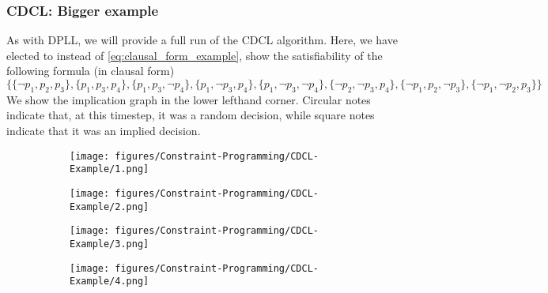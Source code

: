 \subsubsection{CDCL: Bigger example}\label{sec:CDCL_BIG_examp}
As with DPLL, we will provide a full run of the CDCL algorithm. Here, we have elected to instead of \autoref{eq:clausal_form_example}, show the satisfiability of the following formula (in clausal form)
\begin{equation}\label{eq:SAT_example2}
    \Big\{
        \{
            \neg p_1, p_2, p_3
        \},
        \{
            p_1, p_3, p_4
        \},
        \{
            p_1, p_3, \neg p_4
        \},
        \{
            p_1, \neg p_3, p_4
        \},
        \{
            p_1, \neg p_3, \neg p_4
        \},
        \{
            \neg p_2, \neg p_3, p_4
        \},
        \{
            \neg p_1, p_2, \neg p_3
        \},
        \{
            \neg p_1, \neg p_2, p_3
        \}
    \Big\}
\end{equation}
We show the implication graph in the lower lefthand corner. Circular notes indicate that, at this timestep, it was a random decision, while square notes indicate that it was an implied decision.
\begin{figure}[H]
    \centering
    \begin{subfigure}[t]{0.48\textwidth}
        \centering
        \texttt{[image: figures/Constraint-Programming/CDCL-Example/1.png]}
    \end{subfigure}
    \hfill
    \begin{subfigure}[t]{0.48\textwidth}
        \centering
        \texttt{[image: figures/Constraint-Programming/CDCL-Example/2.png]}
    \end{subfigure}
\end{figure}

\begin{figure}[H]
    \centering
    \begin{subfigure}[t]{0.48\textwidth}
        \centering
        \texttt{[image: figures/Constraint-Programming/CDCL-Example/3.png]}
    \end{subfigure}
    \hfill
    \begin{subfigure}[t]{0.48\textwidth}
        \centering
        \texttt{[image: figures/Constraint-Programming/CDCL-Example/4.png]}
    \end{subfigure}
\end{figure}

